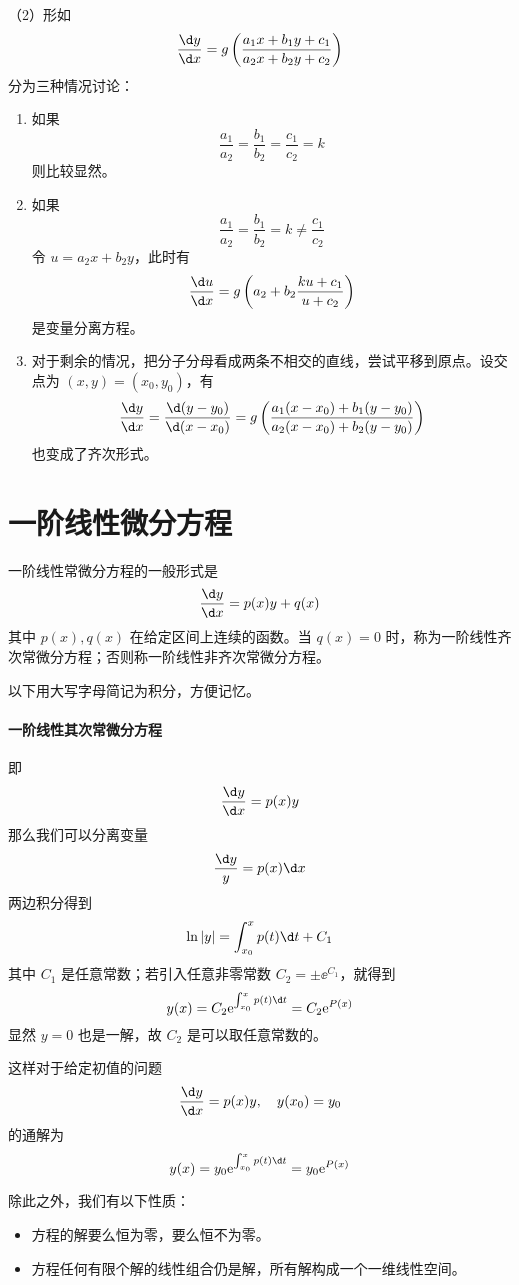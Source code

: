 （2）形如
\[ \frac{\d y}{\d x} = g \left(\frac{a_1 x + b_1 y + c_1}{a_2 x + b_2 y + c_2}\right) \]
分为三种情况讨论：
\begin{enumerate}
	\item 如果
	      \[ \frac{a_1}{a_2} = \frac{b_1}{b_2} = \frac{c_1}{c_2} = k \]
	      则比较显然。
	\item 如果
	      \[ \frac{a_1}{a_2} = \frac{b_1}{b_2} = k \neq \frac{c_1}{c_2} \]
	      令 $u = a_2 x + b_2 y$，此时有
	      \[ \frac{\d u}{\d x} = g \left(a_2 + b_2 \frac{k u + c_1}{u + c_2}\right) \]
	      是变量分离方程。
	\item 对于剩余的情况，把分子分母看成两条不相交的直线，尝试平移到原点。设交点为 $(x, y) = (x_0, y_0)$，有
	      \[ \frac{\d y}{\d x} = \frac{\d (y - y_0)}{\d (x - x_0)} = g \left(\frac{a_1 (x - x_0) + b_1 (y - y_0)}{a_2(x - x_0) + b_2 (y - y_0)} \right) \]
	      也变成了齐次形式。
\end{enumerate}

\section{一阶线性微分方程}

一阶线性常微分方程的一般形式是
\[ \frac{\d y}{\d x} = p(x) y + q(x) \]
其中 $p(x), q(x)$ 在给定区间上连续的函数。当 $q(x) = 0$ 时，称为一阶线性齐次常微分方程；否则称一阶线性非齐次常微分方程。

以下用大写字母简记为积分，方便记忆。

\paragraph{一阶线性其次常微分方程} 即
\[ \frac{\d y}{\d x} = p(x) y \]
那么我们可以分离变量
\[ \frac{\d y}{y} = p(x) \d x \]
两边积分得到
\[ \ln |y| = \int_{x_0}^{x} p(t) \d t + C_1 \]
其中 $C_1$ 是任意常数；若引入任意非零常数 $C_2 = \pm \ee^{C_1}$，就得到
\[ y(x) = C_2 \ee^{\int_{x_0}^{x} p(t) \d t } = C_2 \ee^{P(x)} \]
显然 $y = 0$ 也是一解，故 $C_2$ 是可以取任意常数的。

这样对于给定初值的问题
\[ \frac{\d y}{\d x} = p(x) y, \quad y(x_0) = y_0 \]
的通解为
\[ y(x) = y_0 \ee^{ \int_{x_0}^{x} p(t) \d t } = y_0 \ee^{P(x)} \]

除此之外，我们有以下性质：

\begin{itemize}
	\item 方程的解要么恒为零，要么恒不为零。
	\item 方程任何有限个解的线性组合仍是解，所有解构成一个一维线性空间。
\end{itemize}

